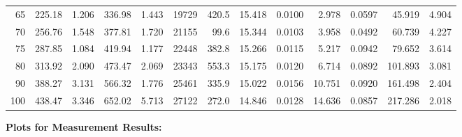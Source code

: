 \documentclass[10pt]{article}
\begin{document}
{\begin{tabular}{|r|rr|rr|rr|rr|rr|r|r|}
       65 &       225.18 &        1.206 &       336.98 &        1.443 &        19729 &        420.5 &       15.418 &       0.0100 &        2.978 &       0.0597 &       45.919 &        4.904 \\
       70 &       256.76 &        1.548 &       377.81 &        1.720 &        21155 &         99.6 &       15.344 &       0.0103 &        3.958 &       0.0492 &       60.739 &        4.227 \\
       75 &       287.85 &        1.084 &       419.94 &        1.177 &        22448 &        382.8 &       15.266 &       0.0115 &        5.217 &       0.0942 &       79.652 &        3.614 \\
       80 &       313.92 &        2.090 &       473.47 &        2.069 &        23343 &        553.3 &       15.175 &       0.0120 &        6.714 &       0.0892 &      101.893 &        3.081 \\
       90 &       388.27 &        3.131 &       566.32 &        1.776 &        25461 &        335.9 &       15.022 &       0.0156 &       10.751 &       0.0920 &      161.498 &        2.404 \\
      100 &       438.47 &        3.346 &       652.02 &        5.713 &        27122 &        272.0 &       14.846 &       0.0128 &       14.636 &       0.0857 &      217.286 &        2.018 \\
\hline
\end{tabular}
}

\vspace{3mm}






\pagebreak
\noindent
{\large \bf Plots for Measurement Results:}
\vspace{5mm}
\end{document}
